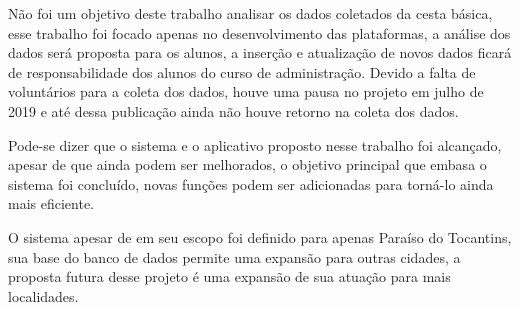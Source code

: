\documentclass{ifto-tex}
\begin{document}
Não foi um objetivo deste trabalho analisar os dados coletados da cesta básica, esse trabalho foi focado
apenas no desenvolvimento das plataformas, a análise dos dados será proposta para os alunos, a inserção e atualização de novos dados ficará de responsabilidade dos alunos do
curso de administração. Devido a falta de voluntários para a coleta dos dados, houve uma pausa no projeto em julho de 2019 e até dessa publicação ainda não houve retorno na coleta dos dados.

Pode-se dizer que o sistema e o aplicativo proposto nesse trabalho foi alcançado, apesar de que ainda podem ser
melhorados, o objetivo principal que embasa o sistema foi concluído, novas funções podem ser adicionadas para
torná-lo ainda mais eficiente.

O sistema apesar de em seu escopo foi definido para apenas Paraíso do Tocantins, sua base do banco de
dados permite uma expansão para outras cidades, a proposta futura desse projeto é uma expansão de sua atuação
para mais localidades.



\postextual



	
	
	
		
	
	
\end{document}
